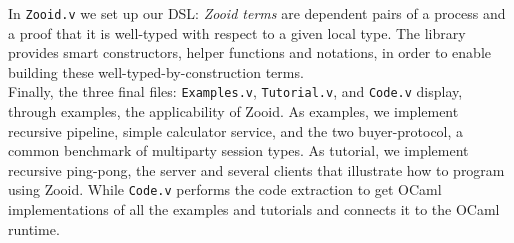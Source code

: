 \documentclass[11pt, a4paper,UKenglish,cleveref, autoref, thm-restate]{article}
\begin{document}
In \texttt{Zooid.v} we set up our DSL: \emph{Zooid terms} are dependent pairs of a process and a proof that it is well-typed with respect to a given local type. The library provides smart constructors, helper functions and notations, in order to enable building these well-typed-by-construction terms. \\

Finally, the three final files: \texttt{Examples.v}, \texttt{Tutorial.v}, and \texttt{Code.v} display, through examples, the applicability of Zooid. As examples, we implement recursive pipeline, simple calculator service, and the two buyer-protocol, a common benchmark of multiparty session types. As tutorial, we implement recursive ping-pong, the server and several clients that illustrate how to program using Zooid. While \texttt{Code.v} performs the code extraction to get OCaml implementations of all the examples and tutorials and connects it to the OCaml runtime.


\setcounter{diagheight}{90}
\end{document}
